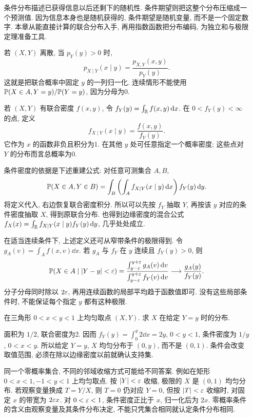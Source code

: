 条件分布描述已获得信息以后还剩下的随机性. 条件期望则把这整个分布压缩成一个预测值. 因为信息本身也是随机获得的, 条件期望是随机变量, 而不是一个固定数字. 本章从能直接计算的联合分布入手, 再用指数函数把分布编码, 为独立和与极限定理准备工具.

若 $(X,Y)$ 离散, 当 $p_Y(y)>0$ 时,
\[p_{X\mid Y}(x\mid y)=\frac{p_{X,Y}(x,y)}{p_Y(y)}.\]
这就是把联合概率中固定 $y$ 的一列归一化. 连续情形不能使用 $\mathbb P(X\in A,Y=y)/\mathbb P(Y=y)$, 因为分母为0.
\begin{definition}[条件密度]
若 $(X,Y)$ 有联合密度 $f(x,y)$, 令 $f_Y(y)=\int_\mathbb R f(x,y)\,\mathrm d x$. 在 $0<f_Y(y)<\infty$ 的点, 定义
\[f_{X\mid Y}(x\mid y)=\frac{f(x,y)}{f_Y(y)}.\]
它作为 $x$ 的函数非负且积分为1. 在其他 $y$ 处可任意指定一个概率密度; 这些点对 $Y$ 的分布而言总概率为0.
\end{definition}
条件密度的依据是下述重建公式: 对任意可测集合 $A,B$,
\[\mathbb P(X\in A,Y\in B)=\int_B\left(\int_Af_{X\mid Y}(x\mid y)\,\mathrm d x\right)f_Y(y)\,\mathrm d y.\]
将定义代入, 右边恢复联合密度积分. 所以可以先按 $f_Y$ 抽取 $Y$, 再按该 $y$ 对应的条件密度抽取 $X$, 得到原联合分布. 也得到边缘密度的混合公式
$f_X(x)=\int_\mathbb R f_{X\mid Y}(x\mid y)f_Y(y)\,\mathrm d y$, 几乎处处成立.

在适当连续条件下, 上述定义还可从窄带条件的极限得到. 令 $g_A(v)=\int_A f(x,v)\dd x$. 若 $g_A$ 与 $f_Y$ 在 $y$ 连续且 $f_Y(y)>0$, 则
\[
\mathbb P(X\in A\mid |Y-y|<\varepsilon)
=\frac{\int_{y-\varepsilon}^{y+\varepsilon}g_A(v)\,\mathrm d v}{\int_{y-\varepsilon}^{y+\varepsilon}f_Y(v)\,\mathrm d v}
\longrightarrow\frac{g_A(y)}{f_Y(y)}.
\]
分子分母同时除以 $2\varepsilon$, 再用连续函数的局部平均趋于函数值即可. 没有这些局部条件时, 不能保证每个指定 $y$ 都有这种极限.
\begin{example}
在三角形 $0<x<y<1$ 上均匀取点 $(X,Y)$. 求 $X$ 在给定 $Y=y$ 时的分布.
\end{example}
\begin{solution}
面积为 $1/2$, 联合密度为2. 因而 $f_Y(y)=\int_0^y2\dd x=2y$, $0<y<1$, 条件密度为 $1/y$, $0<x<y$. 所以给定 $Y=y$, $X$ 均匀分布于 $(0,y)$, 而不是 $(0,1)$. 条件会改变取值范围, 必须在除以边缘密度以前就确认支持集.
\end{solution}

同一个零概率集合, 不同的邻域收缩方式可能给不同答案. 例如在矩形 $0<x<1,-1<y<1$ 上均匀取点. 按 $|Y|<\varepsilon$ 收缩, 极限的 $X$ 是 $(0,1)$ 均匀分布. 若观察变量换成 $T=Y/X$, 则 $T=0$ 仍对应 $Y=0$, 但按 $|T|<\varepsilon$ 收缩时, 对固定 $x$ 的带宽为 $2\varepsilon x$. 对 $0<\varepsilon<1$, 条件密度正比于 $x$, 归一化后为 $2x$. 零概率条件的含义由观察变量及其条件分布决定, 不能只凭集合相同就认定条件分布相同.

